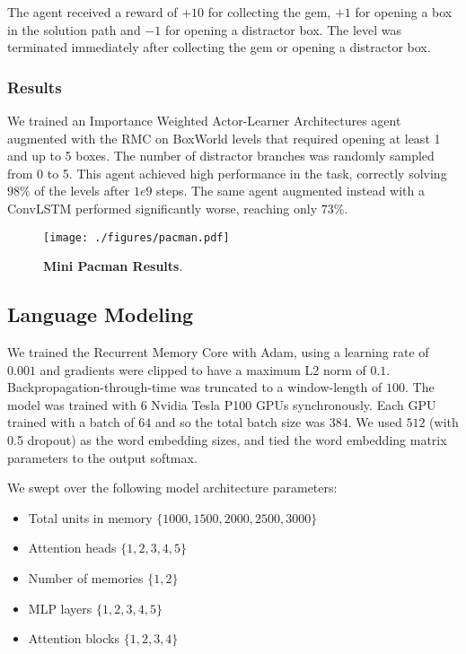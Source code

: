 \documentclass{article}
\begin{document}
The agent received a reward of $+10$ for collecting the gem, $+1$ for opening a box in the solution path and $-1$ for opening a distractor box. The level was terminated immediately after collecting the gem or opening a distractor box.

\subsubsection{Results}
We trained an Importance Weighted Actor-Learner Architectures agent augmented with the RMC on BoxWorld levels that required opening at least 1 and up to 5 boxes. The number of distractor branches was randomly sampled from 0 to 5. This agent achieved high performance in the task, correctly solving $98\%$ of the levels after $1e9$ steps. The same agent augmented instead with a ConvLSTM performed significantly worse, reaching only $73\%$. 

\begin{figure}
    \centering
    \texttt{[image: ./figures/pacman.pdf]}
    \caption{\textbf{Mini Pacman Results}.}
    \label{fig:pacman}
\end{figure}

\subsection{Language Modeling}
\label{app:lm}

We trained the Recurrent Memory Core with Adam, using a learning rate of $0.001$ and gradients were clipped to have a maximum L2 norm of $0.1$. Backpropagation-through-time was truncated to a window-length of $100$. The model was trained with $6$ Nvidia Tesla P100 GPUs synchronously. Each GPU trained with a batch of $64$ and so the total batch size was $384$. We used $512$ (with 0.5 dropout) as the word embedding sizes, and tied the word embedding matrix parameters to the output softmax.

We swept over the following model architecture parameters:

\begin{itemize}
    \item Total units in memory  $\{1000, 1500, 2000, 2500, 3000\}$
    \item Attention heads $\{1, 2, 3, 4, 5\}$ 
    \item Number of memories $\{1, 2\}$
    \item MLP layers $\{1, 2, 3, 4, 5\}$
    \item Attention blocks $\{1, 2, 3, 4\}$
\end{itemize}
\end{document}
